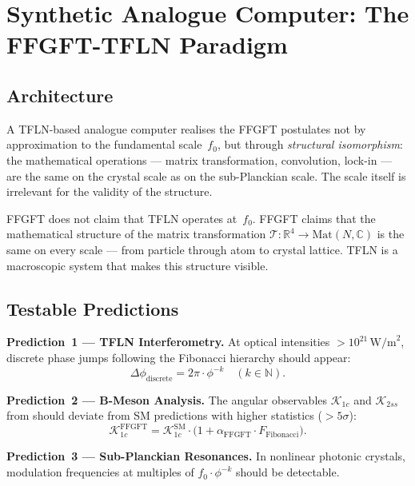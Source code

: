 \section{Synthetic Analogue Computer: The FFGFT-TFLN Paradigm}

\subsection{Architecture}

A TFLN-based analogue computer realises the FFGFT postulates not by
approximation to the fundamental scale~$f_0$, but through \emph{structural
isomorphism}: the mathematical operations — matrix transformation,
convolution, lock-in — are the same on the crystal scale as on the
sub-Planckian scale. The scale itself is irrelevant for the validity
of the structure.

\begin{keybox}
FFGFT does not claim that TFLN operates at~$f_0$. FFGFT claims that
the mathematical structure of the matrix transformation
$\mathcal{T}: \mathbb{R}^4 \to \mathrm{Mat}(N,\mathbb{C})$
is the same on every scale — from particle through atom to crystal
lattice. TFLN is a macroscopic system that makes this structure
visible.
\end{keybox}

\subsection{Testable Predictions}

\begin{predbox}
\textbf{Prediction~1 — TFLN Interferometry.}
At optical intensities $> 10^{21}\,\text{W/m}^2$, discrete phase jumps
following the Fibonacci hierarchy should appear:
\[
  \Delta\phi_{\text{discrete}} = 2\pi \cdot \phi^{-k} \quad (k \in \mathbb{N}).
\]
\end{predbox}

\begin{predbox}
\textbf{Prediction~2 — B-Meson Analysis.}
The angular observables $\mathcal{K}_{1c}$ and $\mathcal{K}_{2ss}$ from
\cite{Arslan2026} should deviate from SM predictions with higher
statistics ($> 5\sigma$):
\[
  \mathcal{K}_{1c}^{\text{FFGFT}}
  = \mathcal{K}_{1c}^{\text{SM}}
    \cdot \bigl(1 + \alpha_{\text{FFGFT}} \cdot F_{\text{Fibonacci}}\bigr).
\]
\end{predbox}

\begin{predbox}
\textbf{Prediction~3 — Sub-Planckian Resonances.}
In nonlinear photonic crystals, modulation frequencies at multiples of
$f_0\cdot\phi^{-k}$ should be detectable.
\end{predbox}

